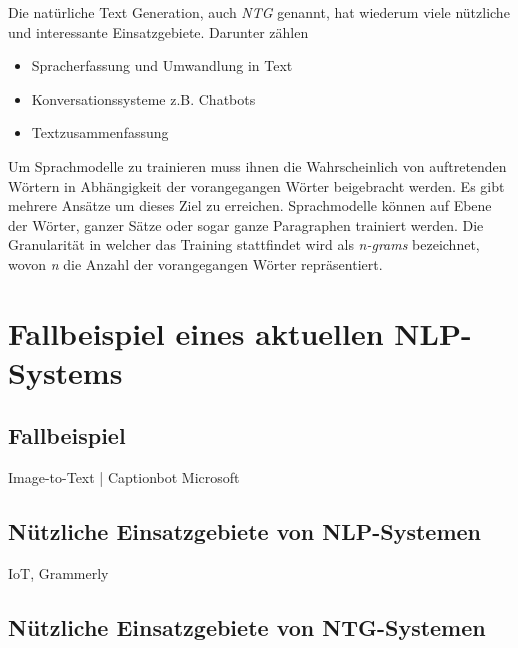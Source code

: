 Die natürliche Text Generation, auch \textit{NTG} genannt, hat wiederum viele nützliche und interessante Einsatzgebiete. Darunter zählen  
\begin{itemize}
\item Spracherfassung und Umwandlung in Text
\item Konversationssysteme z.B. Chatbots
\item Textzusammenfassung
\end{itemize} 

Um Sprachmodelle zu trainieren muss ihnen die Wahrscheinlich von auftretenden Wörtern in Abhängigkeit der vorangegangen Wörter beigebracht werden. Es gibt mehrere Ansätze um dieses Ziel zu erreichen. Sprachmodelle können auf Ebene der Wörter, ganzer Sätze oder sogar ganze Paragraphen trainiert werden. Die Granularität in welcher das Training stattfindet wird als \textit{n-grams} bezeichnet, wovon  \textit{n} die Anzahl der vorangegangen Wörter repräsentiert.

\section{Fallbeispiel eines aktuellen NLP-Systems}

\subsection{Fallbeispiel}

Image-to-Text | Captionbot Microsoft

\subsection{Nützliche Einsatzgebiete von NLP-Systemen}

IoT, Grammerly

\subsection{Nützliche Einsatzgebiete von NTG-Systemen}